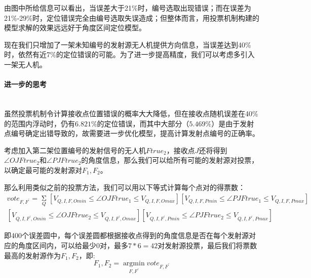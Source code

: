 \documentclass{ctexart}
\newcommand{\subsubsubsection}[1]{\paragraph{#1}\mbox{}\\}
\begin{document}
  由图中所给信息可以看出，当误差大于21\%时，编号选取出现错误；而在误差为21\%-29\%时，定位错误完全由编号选取失误造成；但整体而言，用投票机制构建的模型求解的效果远远好于角度区间定位模型。

  现在我们只增加了一架未知编号的发射源无人机提供方向信息，当误差达到40\%时，依然有近7\%的定位错误的可能。为了进一步提高精度，我们可以考虑多引入一架无人机。

  \subsubsubsection{进一步的思考}

  虽然投票机制令计算接收点位置错误的概率大大降低，但在接收点随机误差在40\%的范围内浮动时，仍有$6.821\%$的定位错误，而其中大部分（$5.469\%$）是由于发射点编号确定出错导致的，故需要进一步优化模型，提高计算发射点编号的正确率。

  考虑加入第二架位置编号的发射信号的无人机$Ftrue_2$，接收点$J$还将得到$\angle OJFtrue_2$和$\angle PJFtrue_2$的角度信息，那么我们可以给所有可能的发射源对投票，以确定最可能的发射源对$F_1,F_2$。

  那么利用类似之前的投票方法，我们可以用以下等式计算每个点对的得票数：
\begin{equation}
\begin{split}
    vote_{F,F^{'}}=\mathop{\Sigma}\limits_{Q} [V_{Q,I,F,Omin} \le \angle OJFtrue_1 \le V_{Q,I,F,Omax}][V_{Q,I,F,Pmin} \le \angle PJFtrue_1 \le V_{Q,I,F,Pmax}]\\
    [V_{Q,I,F^{'},Omin} \le \angle OJFtrue_2 \le V_{Q,I,F^{'},Omax}][V_{Q,I,F^{'},Pmin} \le \angle PJFtrue_2 \le V_{Q,I,F^{'},Pmax}]
\end{split}
\end{equation}

即400个误差圆中，每个误差圆都根据接收点得到的角度信息是否在每个发射源对应的角度区间内，可以给最少$0$对，最多$7*6=42$对发射源投票，最后我们将票数最高的发射源作为$F_1,F_2$，即:
\begin{equation}
 F_1,F_2=\mathop{\arg\min}\limits_{F,F^{'}} vote_{F,F^{'}}
\end{equation}









  
\end{document}
